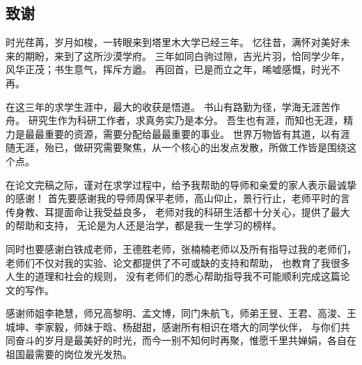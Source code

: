 \documentclass[a4paper,oneside,zihao=5,AutoFakeBold,fontset=windows]{ctexbook}
\begin{document}
\pagestyle{empty}
\frontmatter

%


\tableofcontents
\newpage
\mainmatter
\pagestyle{fancy}
\setcounter{page}{1}
\begin{spacing}{}
  
  
  
  
  
  
  \backmatter
  \printbibliography
  \chapter*{致谢}

  时光荏苒，岁月如梭，一转眼来到塔里木大学已经三年。%
  忆往昔，满怀对美好未来的期盼，来到了这所沙漠学府。%
  三年如同白驹过隙，吉光片羽，恰同学少年，风华正茂；书生意气，挥斥方遒。%
  再回首，已是而立之年，唏嘘感慨，时光不再。  

  在这三年的求学生涯中，最大的收获是悟道。%
  书山有路勤为径，学海无涯苦作舟。%
  研究生作为科研工作者，求真务实乃是本分。%
  吾生也有涯，而知也无涯，精力是最最重要的资源，需要分配给最最重要的事业。%
  世界万物皆有其道，以有涯随无涯，殆已，做研究需要聚焦，从一个核心的出发点发散，所做工作皆是围绕这个点。%

  在论文完稿之际，谨对在求学过程中，给予我帮助的导师和亲爱的家人表示最诚挚的感谢！%
  首先要感谢我的导师周保平老师，高山仰止，景行行止，老师平时的言传身教、耳提面命让我受益良多，%
  老师对我的科研生活都十分关心，提供了最大的帮助和支持，%
  无论是为人还是治学，都是我一生学习的榜样。%

  同时也要感谢白铁成老师，王德胜老师，张楠楠老师以及所有指导过我的老师们，%
  老师们不仅对我的实验、论文都提供了不可或缺的支持和帮助，%
  也教育了我很多人生的道理和社会的规则，%
  没有老师们的悉心帮助指导我不可能顺利完成这篇论文的写作。%

  感谢师姐李艳慧，师兄高黎明、孟文博，同门朱航飞，师弟王昱、王君、高浚、王城坤、李家毅，师妹于晗、杨甜甜，感谢所有相识在塔大的同学伙伴，%
  与你们共同奋斗的岁月是最美好的时光，而今一别不知何时再聚，惟愿千里共婵娟，各自在祖国最需要的岗位发光发热。%


\end{spacing}
\end{document}
